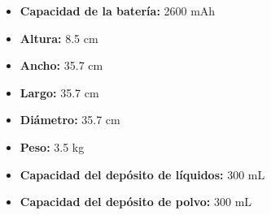 \documentclass{article}
\begin{document}
\begin{adjustwidth}{2em}{}
\begin{itemize}
\begin{itemize}
    \item \textbf {Capacidad de la batería:} 2600 mAh
    \item \textbf {Altura:} 8.5 cm
    \item \textbf {Ancho:} 35.7 cm
    \item \textbf {Largo:} 35.7 cm
    \item \textbf {Diámetro:} 35.7 cm
    \item \textbf {Peso:} 3.5 kg
    \item \textbf {Capacidad del depósito de líquidos:} 300 mL
    \item \textbf {Capacidad del depósito de polvo:} 300 mL
    \end{itemize}
\end{itemize}

\vspace{1\baselineskip} %
\end{adjustwidth}
\end{document}
